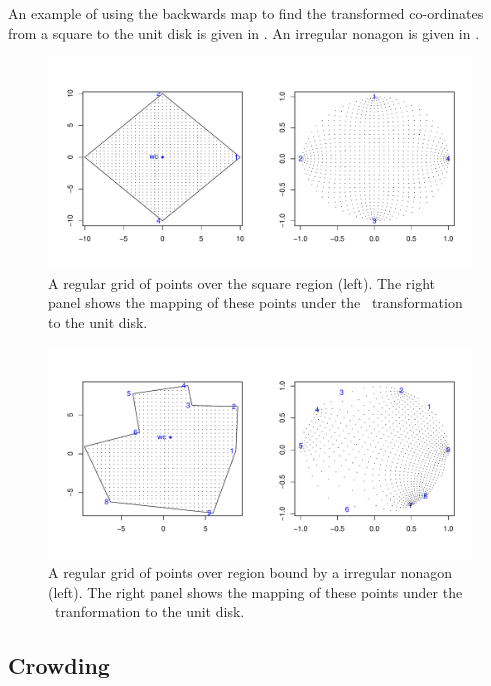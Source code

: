 An example of using the backwards map to find the transformed co-ordinates from a square to the unit disk is given in . An irregular nonagon is given in .


\begin{figure} [bp]
\centering
\includegraphics[scale=0.5]{sc/figs/squaredomain.pdf}
\caption{A regular grid of points over the square region (left). The right panel shows the mapping of these points under the \sch\ transformation to the unit disk.}
\label{squaredomain}
\end{figure}

\begin{figure} [tbp]
\centering
\includegraphics[scale=0.5]{sc/figs/irregulardomain.pdf}
\caption{A regular grid of points over region bound by a irregular nonagon (left). The right panel shows the mapping of these points under the \sch\ tranformation to the unit disk.}
\label{irregdomain}
\end{figure}

\subsection{Crowding}


